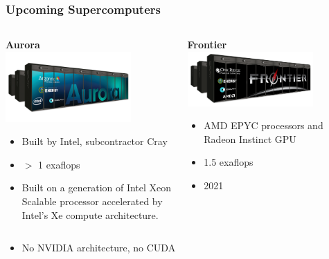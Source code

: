 \begin{frame}
  \frametitle{Upcoming Supercomputers}
  \begin{columns}[T]
    \begin{column}{0.49\textwidth}
      \begin{center}
        {\bf Aurora}\\
        \includegraphics[width=0.75\textwidth]{./figures/aurora}
      \end{center}
    \begin{itemize}
      \item Built by Intel, subcontractor Cray
      \item $>$ 1 exaflops
      \item Built on a generation of Intel Xeon Scalable processor accelerated by Intel’s Xe compute architecture.
    \end{itemize}
    \end{column}
    \begin{column}{0.49\textwidth}
      \begin{center}
        {\bf Frontier}\\
        \includegraphics[width=0.75\textwidth]{./figures/frontier}
      \end{center}
      \begin{itemize}
        \item AMD EPYC processors and Radeon Instinct GPU
        \item 1.5 exaflops
        \item 2021
      \end{itemize}
    \end{column}
  \end{columns}
  \begin{itemize}
    \item No NVIDIA architecture, no CUDA
  \end{itemize}
\end{frame}

